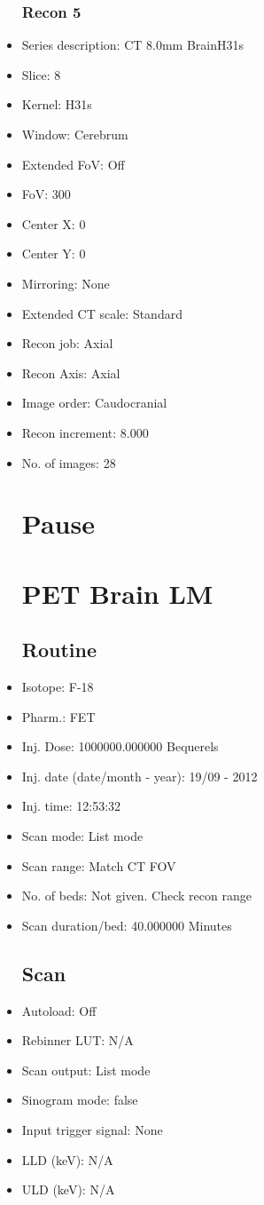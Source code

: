 \documentclass[12pt]{article}
\begin{document}
\begin{itemize}
\subsubsection{Recon 5}
\item Series description: CT  8.0mm BrainH31s
\item Slice: 8
\item Kernel: H31s
\item Window: Cerebrum
\item Extended FoV: Off
\item FoV: 300
\item Center X: 0
\item Center Y: 0
\item Mirroring: None
\item Extended CT scale: Standard
\item Recon job: Axial
\item Recon Axis: Axial
\item Image order: Caudocranial
\item Recon increment: 8.000
\item No. of images: 28
\section{Pause}
\section{PET Brain LM}\subsection{Routine}
\item Isotope: F-18
\item Pharm.: FET
\item Inj. Dose: 1000000.000000 Bequerels
\item Inj. date (date/month - year): 19/09 - 2012
\item Inj. time: 12:53:32
\item Scan mode: List mode
\item Scan range: Match CT FOV
\item No. of beds: Not given. Check recon range
\item Scan duration/bed: 40.000000 Minutes
\subsection{Scan}
\item Autoload: Off
\item Rebinner LUT: N/A
\item Scan output: List mode
\item Sinogram mode: false
\item Input trigger signal: None
\item LLD (keV): N/A
\item ULD (keV): N/A

\end{itemize}
\end{document}
